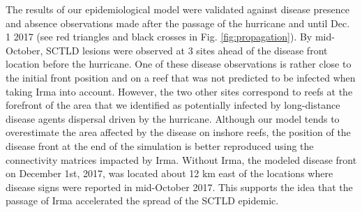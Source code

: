 \documentclass[fleqn,10pt]{wlscirep}
\newcommand{\modif}[1]{{#1}}
\begin{document}
The results of our epidemiological model were validated against disease \modif{presence and absence} observations made after the passage of the hurricane \modif{and until Dec. 1 2017} (see red triangles \modif{and black crosses} in Fig. \ref{fig:propagation}). By mid-October, SCTLD lesions were observed at 3 sites ahead of the disease front location before the hurricane. One of these disease observations is rather close to the initial front position and on a reef that was not predicted to be infected when taking Irma into account. However, the two other sites correspond to reefs at the forefront of the area that we identified as potentially infected by long-distance disease agents dispersal driven by the hurricane. \modif{Although our model tends to overestimate the area affected by the disease on inshore reefs, the position of the disease front at the end of the simulation is better reproduced using the connectivity matrices impacted by Irma. Without Irma, the modeled disease front on December 1st, 2017, was located about 12 km east of the locations where disease signs were reported in mid-October 2017. This supports the idea that the passage of Irma accelerated the spread of the SCTLD epidemic}.
\end{document}
